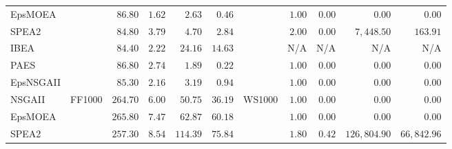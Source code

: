 \begin{table}
{\begin{tabular}{
        |l||
        l|
        r
        r|
        r
        r
        ||l|
        r
        r|
        r
        r|
      }
      EpsMOEA    &                           & $\mathbf{86.80}$                 & $\mathbf{1.62}$                  & $2.63$          & $0.46$                           &                                 & $1.00$            & $0.00$          & $0.00$              & $0.00$           \\
      SPEA2      &                           & $84.80$                          & $3.79$                           & $4.70$          & $2.84$                           &                                 & $\mathbf{2.00}$   & $\mathbf{0.00}$ & $7,448.50$          & $163.91$         \\
      IBEA       &                           & $84.40$                          & $2.22$                           & $24.16$         & $14.63$                          &                                 & N/A               & N/A             & N/A                 & N/A              \\
      PAES       &                           & $\mathbf{86.80}$                 & $\mathbf{2.74}$                  & $\mathbf{1.89}$ & $\mathbf{0.22}$                  &                                 & $1.00$            & $0.00$          & $0.00$              & $0.00$           \\
      EpsNSGAII  &                           & $85.30$                          & $2.16$                           & $3.19$          & $0.94$                           &                                 & $1.00$            & $0.00$          & $0.00$              & $0.00$           \\
      \hline
      NSGAII     & \multirow{6}{*}{ FF1000 } & $264.70$                         & $6.00$                           & $50.75$         & $36.19$                          & \multirow{6}{*}{ WS1000 }       & $1.00$            & $0.00$          & $0.00$              & $0.00$           \\
      EpsMOEA    &                           & $265.80$                         & $7.47$                           & $62.87$         & $60.18$                          &                                 & $1.00$            & $0.00$          & $0.00$              & $0.00$           \\
      SPEA2      &                           & $257.30$                         & $8.54$                           & $114.39$        & $75.84$                          &                                 & $\mathbf{1.80}$   & $\mathbf{0.42}$ & $126,804.90$        & $66,842.96$      \\

\end{tabular}}
\end{table}
